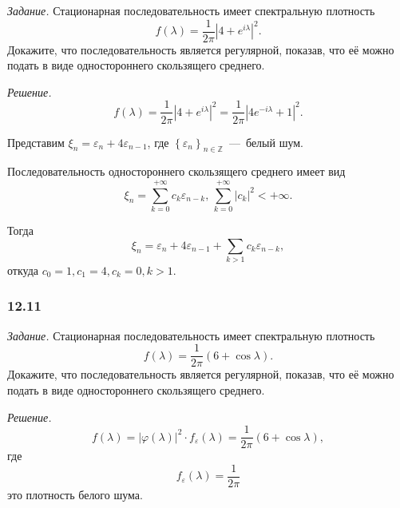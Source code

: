 \textit{Задание.}
Стационарная последовательность имеет спектральную плотность
\begin{equation*}
  f \left( \lambda \right) =
  \frac{1}{2 \pi } \left| 4 + e^{i \lambda } \right|^2.
\end{equation*}
Докажите, что последовательность является регулярной, показав,
что её можно подать в виде одностороннего скользящего среднего.

\textit{Решение.}
\begin{equation*}
  f \left( \lambda \right) =
  \frac{1}{2 \pi } \left| 4 + e^{i \lambda } \right|^2 =
  \frac{1}{2 \pi } \left| 4e^{-i \lambda } + 1 \right|^2.
\end{equation*}

Представим $ \xi_n = \varepsilon_n + 4 \varepsilon_{n - 1}$,
где $ \left\{ \varepsilon_n \right\}_{n \in \mathbb{Z}}$~---~белый шум.

Последовательность одностороннего скользящего среднего имеет вид
\begin{equation*}
  \xi_n = \sum \limits_{k = 0}^{+\infty } c_k \varepsilon_{n - k}, \,
  \sum \limits_{k = 0}^{+\infty } \left| c_k \right|^2 < +\infty.
\end{equation*}

Тогда
\begin{equation*}
  \xi_n =
  \varepsilon_n + 4 \varepsilon_{n - 1} + \sum \limits_{k > 1} c_k \varepsilon_{n - k},
\end{equation*}
откуда $c_0 = 1, c_1 = 4, c_k = 0, k > 1$.

\subsubsection*{12.11}

\textit{Задание.}
Стационарная последовательность имеет спектральную плотность
\begin{equation*}
  f \left( \lambda \right) =
  \frac{1}{2 \pi } \left( 6 + \cos \lambda \right).
\end{equation*}
Докажите, что последовательность является регулярной, показав,
что её можно подать в виде одностороннего скользящего среднего.

\textit{Решение.}
\begin{equation*}
  f \left( \lambda \right) =
  \left| \varphi \left( \lambda \right) \right|^2 \cdot f_{ \varepsilon } \left( \lambda \right) =
  \frac{1}{2 \pi } \left( 6 + \cos \lambda \right),
\end{equation*}
где
\begin{equation*}
  f_{ \varepsilon } \left( \lambda \right) =
  \frac{1}{2 \pi }
\end{equation*}
это плотность белого шума.

